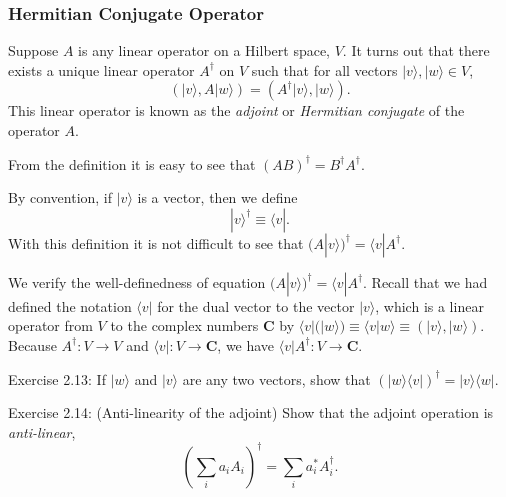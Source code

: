
\subsubsection{Hermitian Conjugate Operator}

\begin{definition}
    Suppose $A$ is any linear operator on a Hilbert space, $V$. It turns out that there exists a unique linear operator $A^{\dagger}$ on $V$ such that for all vectors $|v\rangle,|w\rangle \in V$,
\begin{equation}
    (|v\rangle, A|w\rangle)=\left(A^{\dagger}|v\rangle,|w\rangle\right).
\end{equation}
This linear operator is known as the \textit{adjoint} or \textit{Hermitian conjugate} of the operator $A$. 
\end{definition}

From the definition it is easy to see that $(A B)^{\dagger}=B^{\dagger} A^{\dagger}$. 

By convention, if $|v\rangle$ is a vector, then we define 
\begin{equation}
    |v\rangle^{\dagger} \equiv\langle v|.
\end{equation}
With this definition it is not difficult to see that $(A|v\rangle)^{\dagger}=\langle v| A^{\dagger}.$

\begin{remark}
    We verify the well-definedness of equation $(A|v\rangle)^{\dagger}=\langle v| A^{\dagger}$. Recall that we had defined the notation $\langle v|$ for the dual vector to the vector $|v\rangle$, which is a linear operator from $V$ to the complex numbers $\mathbf{C}$ by $\langle v|(|w\rangle) \equiv\langle v | w\rangle \equiv(|v\rangle,|w\rangle).$ Because $A^{\dagger} \colon V \to V$ and $\langle v | \colon V \to \mathbf{C}$, we have $\langle v| A^{\dagger}\colon V \to \mathbf{C}.$
\end{remark}

\begin{exercise}
Exercise 2.13: If $|w\rangle$ and $|v\rangle$ are any two vectors, show that $(|w\rangle\langle v|)^{\dagger}=|v\rangle\langle w|$.
\end{exercise}

\begin{exercise}
Exercise 2.14: (Anti-linearity of the adjoint) Show that the adjoint operation is \textit{anti-linear},
\begin{equation}
    \left(\sum_{i} a_{i} A_{i}\right)^{\dagger}=\sum_{i} a_{i}^{*} A_{i}^{\dagger}.
\end{equation}
\end{exercise}

